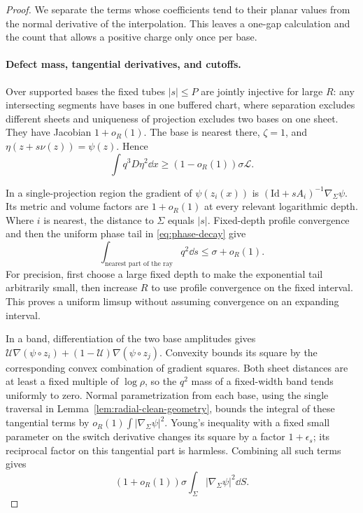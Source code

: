 \begin{proof}
We separate the terms whose coefficients tend to their planar values
from the normal derivative of the interpolation. This leaves a one-gap
calculation and the count that allows a positive charge only once per
base.

\paragraph{Defect mass, tangential derivatives, and cutoffs.}

Over supported bases the fixed tubes $|s|\le P$ are jointly injective for large $R$: any intersecting segments have bases in one buffered chart, where separation excludes different sheets and uniqueness of projection excludes two bases on one sheet. They have Jacobian $1+o_R(1)$. The base is nearest there, $\zeta=1$, and
$\eta(z+s\nu(z))=\psi(z)$. Hence
\begin{equation}\label{eq:radial-test-mass}
 \int q^3D\eta^2\dd x\ge(1-o_R(1))\sigma\mathcal L.
\end{equation}

In a single-projection region the gradient of $\psi(z_i(x))$ is
$(\mathrm{Id}+sA_i)^{-1}\nabla_\Sigma\psi$. Its metric and volume factors are $1+o_R(1)$ at every relevant logarithmic depth. Where $i$ is nearest, the distance to $\Sigma$ equals $|s|$. Fixed-depth profile convergence and then the uniform phase tail in \eqref{eq:phase-decay} give
\[
 \int_{\text{nearest part of the ray}}q^2\dd s\le\sigma+o_R(1).
\]
For precision, first choose a large fixed depth to make the exponential tail arbitrarily small, then increase $R$ to use profile convergence on the fixed interval. This proves a uniform limsup without assuming convergence on an expanding interval.

In a band, differentiation of the two base amplitudes gives
$\mathcal U\nabla(\psi\circ z_i)+(1-\mathcal U)\nabla(\psi\circ z_j)$. Convexity bounds its square by the corresponding convex combination of gradient squares. Both sheet distances are at least a fixed multiple of $\log\rho$, so the $q^2$ mass of a fixed-width band tends uniformly to zero. Normal parametrization from each base, using the single traversal in Lemma~\ref{lem:radial-clean-geometry}, bounds the integral of these tangential terms by
$o_R(1)\int|\nabla_\Sigma\psi|^2$. Young's inequality with a fixed small parameter on the switch derivative changes its square by a factor $1+\epsilon_s$; its reciprocal factor on this tangential part is harmless. Combining all such terms gives
\begin{equation}\label{eq:radial-tangent-cost}
 (1+o_R(1))\sigma\int_\Sigma|\nabla_\Sigma\psi|^2\dd S.
\end{equation}


\end{proof}
